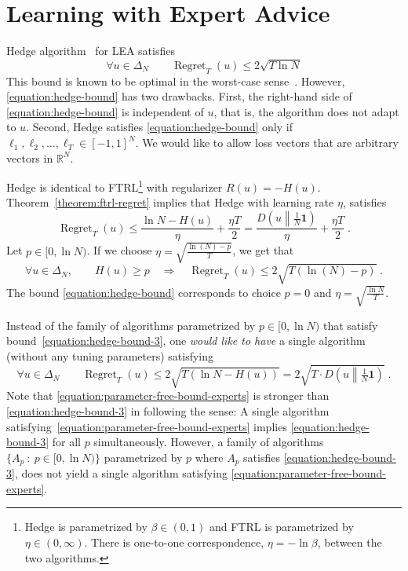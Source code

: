 \documentclass{colt2016} %
\DeclareMathOperator{\Regret}{Regret}
\newcommand{\R}{\mathbb{R}}     %
\newcommand{\KL}[2]{D\left({#1}\middle\|{#2}\right)}  %
\newcommand{\indicator}{\mathbf{1}}
\begin{document}
\section{Learning with Expert Advice}

Hedge algorithm~\citep{Freund-Schapire-1997} for LEA satisfies
\begin{equation}
\label{equation:hedge-bound}
\forall u \in \Delta_N \qquad \Regret_T(u) \le 2\sqrt{T \ln N}
\end{equation}
This bound is known to be optimal in the worst-case sense~\cite[Section
3.7]{Cesa-Bianchi-Lugosi-2006}. However, \eqref{equation:hedge-bound} has two
drawbacks.  First, the right-hand side of \eqref{equation:hedge-bound} is
independent of $u$, that is, the algorithm does not adapt to $u$.
Second, Hedge satisfies \eqref{equation:hedge-bound} only if $\ell_1, \ell_2,
\dots, \ell_T \in [-1,1]^N$. We would like to allow loss vectors that are
arbitrary vectors in $\R^N$.

Hedge is identical to FTRL\footnote{Hedge is
parametrized by $\beta \in (0,1)$ and FTRL is parametrized by $\eta \in (0,
\infty)$.  There is one-to-one correspondence, $\eta = - \ln \beta$, between
the two algorithms.} with regularizer $R(u) = -H(u)$.
Theorem~\ref{theorem:ftrl-regret} implies that Hedge with learning rate $\eta$, satisfies
\begin{equation}
\label{equation:hedge-bound-2}
\Regret_T(u) \le \frac{\ln N - H(u)}{\eta} + \frac{\eta T}{2} = \frac{\KL{u}{\frac{1}{N}\indicator}}{\eta} + \frac{\eta T}{2} \; .
\end{equation}
Let $p \in [0, \ln N)$. If we choose $\eta = \sqrt{\frac{\ln(N) - p}{T}}$, we get that
\begin{equation}
\label{equation:hedge-bound-3}
\forall u \in \Delta_N, \qquad H(u) \ge p \quad \Longrightarrow \quad \Regret_T(u) \le 2\sqrt{T (\ln(N) - p)} \; .
\end{equation}
The bound \eqref{equation:hedge-bound} corresponds to choice $p=0$ and
$\eta=\sqrt{\frac{\ln N}{T}}$.

Instead of the family of algorithms parametrized by $p \in [0,\ln N)$ that
satisfy bound~\eqref{equation:hedge-bound-3}, one \emph{would like to have} a single
algorithm (without any tuning parameters) satisfying
\begin{equation}
\label{equation:parameter-free-bound-experts}
\forall u \in \Delta_N \qquad \Regret_T(u) \le 2\sqrt{T (\ln N - H(u))} = 2\sqrt{T \cdot \KL{u}{\tfrac{1}{N} \indicator}} \; .
\end{equation}
Note that \eqref{equation:parameter-free-bound-experts} is stronger than
\eqref{equation:hedge-bound-3} in following the sense: A single algorithm
satisfying~\eqref{equation:parameter-free-bound-experts} implies
\eqref{equation:hedge-bound-3} for all $p$ simultaneously. However, a family
of algorithms $\{A_p ~:~ p \in [0,\ln N)\}$ parametrized by $p$ where $A_p$
satisfies \eqref{equation:hedge-bound-3}, does not yield a single
algorithm satisfying \eqref{equation:parameter-free-bound-experts}.
\end{document}
